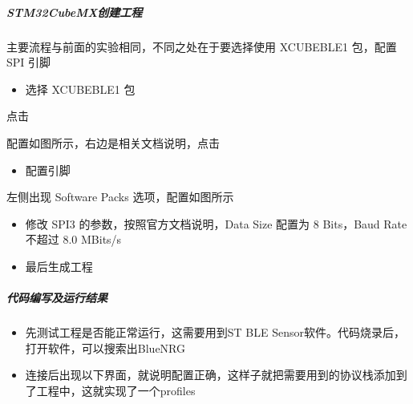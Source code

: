 \documentclass[a4paper,12pt,english]{sphinxmanual}
\begin{document}
\subparagraph{STM32CubeMX创建工程}
\label{\detokenize{exp-stm32/ble/Profiles:stm32cubemx}}
\sphinxAtStartPar
主要流程与前面的实验相同，不同之处在于要选择使用 X\sphinxhyphen{}CUBE\sphinxhyphen{}BLE1 包，配置 SPI 引脚
\begin{itemize}
\item {} 
\sphinxAtStartPar
选择 X\sphinxhyphen{}CUBE\sphinxhyphen{}BLE1 包

\end{itemize}

\sphinxAtStartPar
点击 

\sphinxAtStartPar
{}

\sphinxAtStartPar
配置如图所示，右边是相关文档说明，点击 

\sphinxAtStartPar
{}
\begin{itemize}
\item {} 
\sphinxAtStartPar
配置引脚

\end{itemize}

\sphinxAtStartPar
左侧出现 Software Packs 选项，配置如图所示

\sphinxAtStartPar
{}
\begin{itemize}
\item {} 
\sphinxAtStartPar
修改 SPI3 的参数，按照官方文档说明，Data Size 配置为 8 Bits，Baud Rate 不超过 8.0 MBits/s

\end{itemize}

\sphinxAtStartPar
{}
\begin{itemize}
\item {} 
\sphinxAtStartPar
最后生成工程

\end{itemize}


\subparagraph{代码编写及运行结果}
\label{\detokenize{exp-stm32/ble/Profiles:id7}}\begin{itemize}
\item {} 
\sphinxAtStartPar
先测试工程是否能正常运行，这需要用到ST BLE Sensor软件。代码烧录后，打开软件，可以搜索出BlueNRG

\end{itemize}


\begin{itemize}
\item {} 
\sphinxAtStartPar
连接后出现以下界面，就说明配置正确，这样子就把需要用到的协议栈添加到了工程中，这就实现了一个profiles

\end{itemize}
\end{document}
